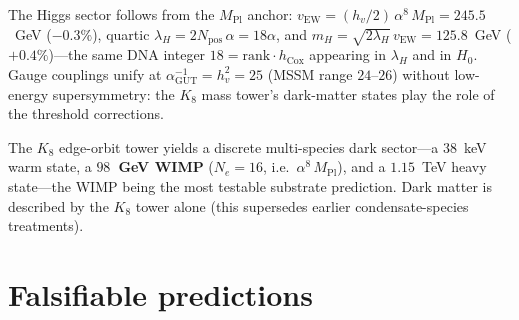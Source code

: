 \documentclass[11pt]{article}
\newcommand{\HV}{h_v}
\newcommand{\hcox}{h_{\mathrm{Cox}}}
\newcommand{\Mpl}{M_{\mathrm{Pl}}}
\newcommand{\vEW}{v_{\mathrm{EW}}}
\begin{document}
The Higgs sector follows from the $\Mpl$ anchor: $\vEW = (\HV/2)\,\alpha^8\,\Mpl = 245.5$~GeV ($-0.3\%$), quartic $\lambda_H = 2 N_{\mathrm{pos}}\,\alpha = 18\alpha$, and $m_H = \sqrt{2\lambda_H}\,\vEW = 125.8$~GeV ($+0.4\%$)---the same DNA integer $18 = \text{rank}\cdot\hcox$ appearing in $\lambda_H$ and in $H_0$. Gauge couplings unify at $\alpha_{\mathrm{GUT}}^{-1} = \HV^2 = 25$ (MSSM range $24$--$26$) without low-energy supersymmetry: the $K_8$ mass tower's dark-matter states play the role of the threshold corrections.

The $K_8$ edge-orbit tower yields a discrete multi-species dark sector---a $38$~keV warm state, a \textbf{$98$~GeV WIMP} ($N_e = 16$, i.e.\ $\alpha^8\,\Mpl$), and a $1.15$~TeV heavy state---the WIMP being the most testable substrate prediction. Dark matter is described by the $K_8$ tower alone (this supersedes earlier condensate-species treatments).

\section{Falsifiable predictions}
\label{sec:falsifiers}
\end{document}
